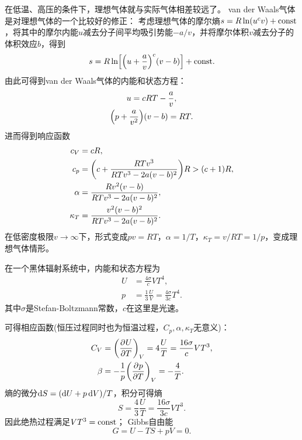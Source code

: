 在低温、高压的条件下，理想气体就与实际气体相差较远了。
van der Waals气体是对理想气体的一个比较好的修正：
考虑理想气体的摩尔熵$s=R\ln(u^cv)+\const$，将其中的摩尔内能$u$减去分子间平均吸引势能$-a/v$，并将摩尔体积$v$减去分子的体积效应$b$，得到
\begin{equation}
	s=R\ln\Bigfkh{\Bigkh{u+\frac av}^c(v-b)}+\const.
\end{equation}
由此可得到van der Waals气体的内能和状态方程：
\begin{subequations}
	\begin{gather}
		u=cRT-\frac av,\\
		\Bigkh{p+\frac a{v^2}}(v-b)=RT.
	\end{gather}
\end{subequations}
进而得到响应函数
\begin{subequations}
	\begin{align}
		c_V&=cR,\\
		c_p&=\biggkh{c+\frac{RTv^3}{RTv^3-2a(v-b)^2}}R>(c+1)R,\\
		\alpha&=\frac{Rv^2(v-b)}{RTv^3-2a(v-b)^2},\\
		\kappa_T&=\frac{v^2(v-b)^2}{RTv^3-2a(v-b)^2}.
	\end{align}
\end{subequations}
在低密度极限$v\to\infty$下，形式变成$pv=RT$，$\alpha=1/T$，$\kappa_T=v/RT=1/p$，变成理想气体情形。


在一个黑体辐射系统中，内能和状态方程为
\begin{subequations}
	\begin{align}
		U&=\frac{4\sigma}cVT^4,\\
		p&=\frac13\frac UV=\frac{4\sigma}{3c}T^4.
	\end{align}
\end{subequations}
其中$\sigma$是Stefan-Boltzmann常数，$c$在这里是光速。

可得相应函数(恒压过程同时也为恒温过程，$C_p,\alpha,\kappa_T$无意义)：
\begin{subequations}
	\begin{align}
		C_V&=\pu[V]UT=4\frac UT=\frac{16\sigma}cVT^3,\\
		\beta&=-\frac1p\pu[V]pT=-\frac4T.
	\end{align}
\end{subequations}
熵的微分$\d S=(\d U+p\d V)/T$，积分可得熵
\begin{equation}
	S=\frac43\frac UT=\frac{16\sigma}{3c}VT^3.
\end{equation}
因此绝热过程满足$VT^3=\const$；
Gibbs自由能
\begin{equation}
	G=U-TS+pV=0.
\end{equation}

